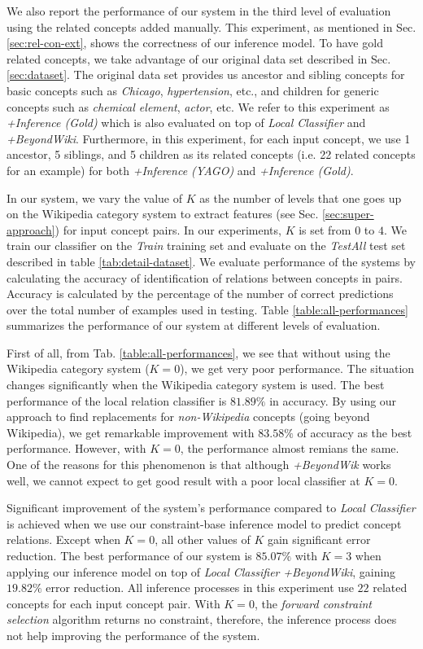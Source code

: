 We also report the performance of our system in the third level of
evaluation using the related concepts added manually.  This
experiment, as mentioned in Sec.  \ref{sec:rel-con-ext}, shows the
correctness of our inference model.  To have gold related concepts, we
take advantage of our original data set described in
Sec. \ref{sec:dataset}. The original data set provides us ancestor and
sibling concepts for basic concepts such as {\em Chicago}, {\em
  hypertension}, etc., and children for generic concepts such as {\em
  chemical element}, {\em actor}, etc. We refer to this experiment as
{\em +Inference (Gold)} which is also evaluated on top of {\em Local
  Classifier} and {\em +BeyondWiki}. Furthermore, in this experiment,
for each input concept, we use 1 ancestor, 5 siblings, and 5 children
as its related concepts (i.e. 22 related concepts for an example) for
both {\em +Inference (YAGO)} and {\em +Inference (Gold)}.

In our system, we vary the value of $K$ as the number of levels that
one goes up on the Wikipedia category system to extract features (see
Sec. \ref{sec:super-approach}) for input concept pairs. In our
experiments, $K$ is set from $0$ to $4$.  We train our classifier on
the {\em Train} training set and evaluate on the {\em TestAll} test
set described in table \ref{tab:detail-dataset}. We evaluate
performance of the systems by calculating the accuracy of
identification of relations between concepts in pairs. Accuracy is
calculated by the percentage of the number of correct predictions over
the total number of examples used in testing. Table
\ref{table:all-performances} summarizes the performance of our system
at different levels of evaluation.

First of all, from Tab. \ref{table:all-performances}, we see that
without using the Wikipedia category system ($K=0$), we get very poor
performance. The situation changes significantly when the Wikipedia
category system is used. The best performance of the local relation
classifier is $81.89\%$ in accuracy. By using our approach to find
replacements for {\em non-Wikipedia} concepts (going beyond
Wikipedia), we get remarkable improvement with $83.58\%$ of accuracy
as the best performance. However, with $K=0$, the performance almost
remians the same. One of the reasons for this phenomenon is that although
{\em +BeyondWik} works well, we cannot expect to get good result with
a poor local classifier at $K=0$.

Significant improvement of the system's performance compared to {\em
  Local Classifier} is achieved when we use our constraint-base
inference model to predict concept relations. Except when $K=0$, all
other values of $K$ gain significant error reduction. The best
performance of our system is $85.07\%$ with $K=3$ when applying our
inference model on top of {\em Local Classifier} {\em +BeyondWiki},
gaining $19.82\%$ error reduction. All inference processes in this
experiment use $22$ related concepts for each input concept pair. With
$K=0$, the {\em forward constraint selection} algorithm returns no
constraint, therefore, the inference process does not help improving
the performance of the system.

